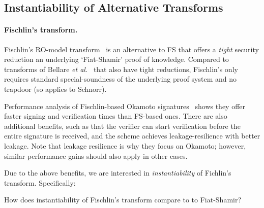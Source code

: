 \iffalse
\subsection{Instantiability of Alternative Transforms}



\paragraph*{Fischlin's transform.} 
 Fischlin's RO-model transform~\cite{C:Fischlin05} is an alternative to FS that offers a \emph{tight} security reduction an underlying `Fiat-Shamir' proof of knowledge. Compared to transforms of 
Bellare \emph{et al.}~\cite{AC:BelPoeSte16} that also have tight reductions, Fischlin's only requires standard special-soundness of the underlying proof system and no trapdoor (so applies to Schnorr).
 
 Performance analysis of  Fischlin-based Okamoto signatures~\cite{AFRICACRYPT:DagVen14} shows they offer faster signing and verification times than FS-based ones. There are also additional benefits, such as that the verifier can start  verification before the entire signature is received, and the scheme achieves leakage-resilience with better leakage. Note that leakage resilience is why they  focus on Okamoto; however, similar performance gains should also apply in other cases.

Due to the above benefits, we are interested in \emph{instantiability} of Fichlin's transform. Specifically: 
\begin{ques}
   How does instantiability of Fischlin's transform compare to   to Fiat-Shamir?
\end{ques}

